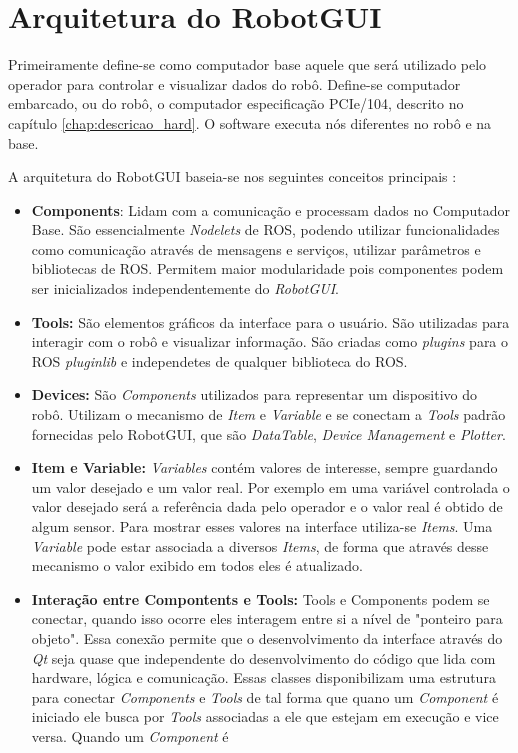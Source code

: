 \section{Arquitetura do RobotGUI}

Primeiramente define-se como computador base aquele que será utilizado pelo operador para controlar e visualizar dados do robô. Define-se computador embarcado, ou do robô, o computador especificação PCIe/104, descrito no capítulo \ref{chap:descricao_hard}. O software executa nós diferentes no robô e na base.

A arquitetura do RobotGUI baseia-se nos seguintes conceitos principais \citep{nunes2013doris}:

\begin{itemize}
\item \textbf{Components}: Lidam com a comunicação e processam dados no Computador Base. São essencialmente \textit{Nodelets} de ROS, podendo utilizar funcionalidades como comunicação através de mensagens e serviços, utilizar parâmetros e bibliotecas de ROS. Permitem maior modularidade pois componentes podem ser inicializados independentemente do \textit{RobotGUI}.

\item \textbf{Tools:} São elementos gráficos da interface para o usuário. São utilizadas para interagir com o robô e visualizar informação. São criadas como \textit{plugins} para o ROS \textit{pluginlib} e independetes de qualquer biblioteca do ROS.

\item \textbf{Devices:} São \textit{Components} utilizados para representar um dispositivo do robô. Utilizam o mecanismo de \textit{Item} e \textit{Variable} e se conectam a \textit{Tools} padrão fornecidas pelo RobotGUI, que são \textit{DataTable}, \textit{Device Management} e \textit{Plotter}. 

\item \textbf{Item e Variable:} \textit{Variables} contém valores de interesse, sempre guardando um valor desejado e um valor real. Por exemplo em uma variável controlada o valor desejado será a referência dada pelo operador e o valor real é obtido de algum sensor. Para mostrar esses valores na interface utiliza-se \textit{Items}. Uma \textit{Variable} pode estar associada a diversos \textit{Items}, de forma que através desse mecanismo o valor exibido em todos eles é atualizado. 

\item \textbf{Interação entre Compontents e Tools:} Tools e Components podem se conectar, quando isso ocorre eles interagem entre si a nível de "ponteiro para objeto". Essa conexão permite que o desenvolvimento da interface através do \textit{Qt} seja quase que independente do desenvolvimento do código que lida com hardware, lógica e comunicação. Essas classes disponibilizam uma estrutura para conectar \textit{Components} e \textit{Tools} de tal forma que quano um \textit{Component} é iniciado ele busca por \textit{Tools} associadas a ele que estejam em execução e vice versa. Quando um \textit{Component} é 


\end{itemize}
